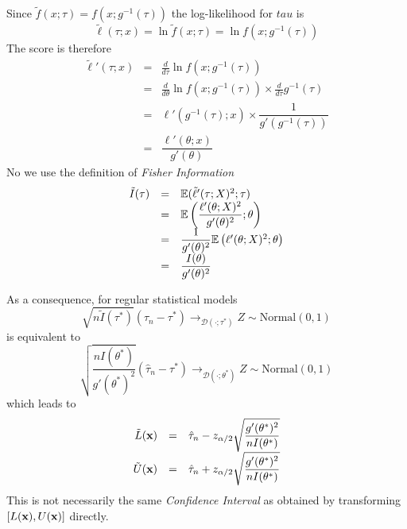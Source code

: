 \documentclass[11pt,a4paper]{article}
\begin{document}
Since $\tilde{f}(x;\tau)=f(x;g^{-1}(\tau))$ the log-likelihood for $tau$ is
$$\tilde\ell(\tau;x)=\ln\tilde{f}(x;\tau)=\ln f(x;g^{-1}(\tau))$$
The score is therefore
\[\begin{array}{rcl}
\tilde\ell'(\tau;x)&=&\frac{d}{d\tau}\ln f(x;g^{-1}(\tau))\\
&=&\frac{d}{d\theta}\ln f(x;g^{-1}(\tau))\times\frac{d}{d\tau}g^{-1}(\tau)\\
&=&\ell'(g^{-1}(\tau);x)\times\dfrac{1}{g'(g^{-1}(\tau))}\\
&=&\dfrac{\ell'(\theta;x)}{g'(\theta)}
\end{array}\]
No we use the definition of \textit{Fisher Information}
\[\begin{array}{rcl}
\tilde{I}(\tau)&=&\mathbb{E}(\tilde\ell'(\tau;X)^2;\tau)\\
&=&\mathbb{E}\left(\dfrac{\ell'(\theta;X)^2}{g'(\theta)^2};\theta\right)\\
&=&\dfrac{1}{g'(\theta)^2}\mathbb{E}\left(\ell'(\theta;X)^2;\theta\right)\\
&=&\dfrac{I(\theta)}{g'(\theta)^2}
\end{array}\]

\remark{}
As a consequence, for regular statistical models
$$\sqrt{n\tilde{I}(\tau^*)}(\hat\tau_n-\tau^*)\to_{\mathcal{D}(\cdot;\tau^*)}Z\sim\text{Normal}(0,1)$$
is equivalent to
$$\sqrt{\dfrac{nI(\theta^*)}{g'(\theta^*)^2}}(\hat\tau_n-\tau^*)\to_{\mathcal{D}(\cdot;\theta^*)}Z\sim\text{Normal}(0,1)$$
which leads to 
\[\begin{array}{rcl}
\tilde{L}(\textbf{x})&=&\hat\tau_n-z_{\alpha/2}\sqrt{\dfrac{g'(\theta^*)^2}{nI(\theta^*)}}\\
\tilde{U}(\textbf{x})&=&\hat\tau_n+z_{\alpha/2}\sqrt{\dfrac{g'(\theta^*)^2}{nI(\theta^*)}}
\end{array}\]
\nb This is not necessarily the same \textit{Confidence Interval} as obtained by transforming $[L(\textbf{x}),U(\textbf{x})]$ directly.\\
\end{document}
